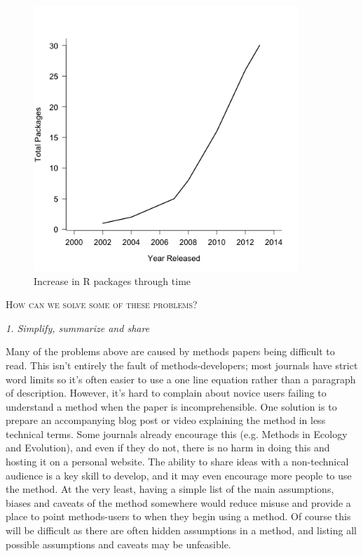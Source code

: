 \documentclass[a4paper,12pt]{article}
\renewcommand{\section}[1]{
  \bigskip
  \begin{center}
  \begin{Large}
  \normalfont\scshape #1
  \medskip
  \end{Large}
  \end{center}
}
\renewcommand{\subsection}[1]{
  \bigskip
  \begin{center}
  \begin{large}
  \normalfont\itshape #1
  \end{large}
  \end{center}
}
\begin{document}
\begin{figure}[h]
\centering
\includegraphics[width = 10cm]{PCMRpackages.png}
\caption{Increase in R packages through time}
\label{PCMRpackages}
\end{figure}

\section{How can we solve some of these problems?}

\subsection{1. Simplify, summarize and share}
Many of the problems above are caused by methods papers being difficult to read. 
This isn't entirely the fault of methods-developers; most journals have strict word limits so it's often easier to use a one line equation rather than a paragraph of description. 
However, it's hard to complain about novice users failing to understand a method when the paper is incomprehensible. %
One solution is to prepare an accompanying blog post or video explaining the method in less technical terms. 
Some journals already encourage this (e.g. Methods in Ecology and Evolution), and even if they do not, there is no harm in doing this and hosting it on a personal website. 
The ability to share ideas with a non-technical audience is a key skill to develop, and it may even encourage more people to use the method. 
At the very least, having a simple list of the main assumptions, biases and caveats of the method somewhere would reduce misuse and provide a place to point methods-users to when they begin using a method.
Of course this will be difficult as there are often hidden assumptions in a method, and listing all possible assumptions and caveats may be unfeasible.\\
\end{document}
